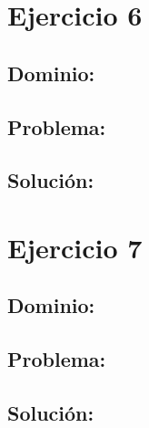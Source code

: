 \documentclass[11pt, spanish]{article}
\begin{document}
\section{Ejercicio 6}

\subsection{Dominio:}


\subsection{Problema:}

\subsection{Solución:}







\section{Ejercicio 7}


\subsection{Dominio:}


\subsection{Problema:}

\subsection{Solución:}
\end{document}
